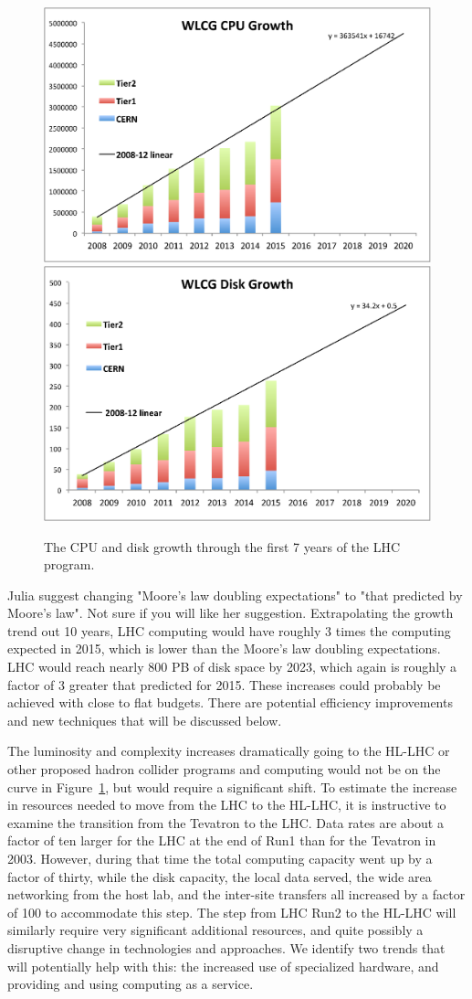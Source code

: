 \begin{figure}[htb]
\begin{center}
\includegraphics[width=0.45\hsize]{CpF-E2/Growth1.eps}
\includegraphics[width=0.45\hsize]{CpF-E2/Growth2.eps}
\caption{The CPU and disk growth through the first 7 years of the LHC program.}
\label{fig:growth}
\end{center}
\end{figure}


{\color{red} Julia suggest changing "Moore's law doubling expectations" to "that predicted by Moore's law".  Not sure if you will like her suggestion.}
Extrapolating the growth trend out 10 years,  LHC computing would have
roughly 3 times the computing expected in 2015, which is lower than the
Moore's law doubling expectations.  LHC would reach nearly 800 PB of disk 
space by
2023, which again is roughly a factor of 3 greater that predicted for
2015.   These increases could
probably be achieved with close to flat budgets.   There are potential
efficiency improvements and new techniques that will be discussed below.

The luminosity and complexity increases dramatically
going to the HL-LHC or other proposed hadron collider programs
and computing would not be on
the curve in Figure~\ref{fig:growth}, but would require a significant shift.
To estimate the increase in resources needed to move from the LHC to the
HL-LHC, it is instructive to examine the transition from the Tevatron to the
LHC.  Data rates are about a factor of ten larger for the LHC at the end
of Run1 than for the Tevatron in 2003.
However,  during that time the total computing
capacity went up by a factor of thirty, while the disk capacity, the local data
served, the wide area networking from the host lab, and the inter-site
transfers all increased by a factor of 100 to accommodate this step.  The step
from LHC Run2 to the HL-LHC will similarly require very significant additional
resources, and quite possibly a disruptive change in technologies and
approaches.
We identify two trends that will potentially help with this: the
increased use of specialized hardware, and providing and using computing as a
service.

